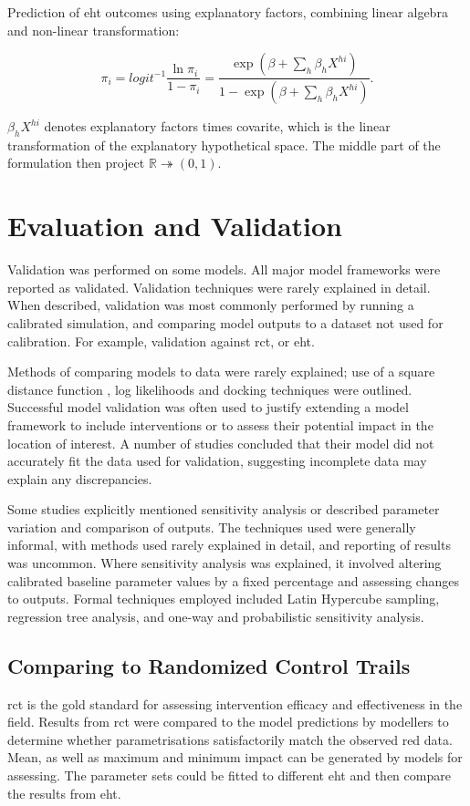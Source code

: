 \documentclass[a4paper, 12pt, twoside]{article}
\begin{document}
Prediction of \gls{eht} outcomes using explanatory factors, combining linear algebra and non-linear transformation\cite{Sherrard-Smith2018b}:

\[
	\pi_i = logit^{-1} \frac{\ln \pi_i}{1-\pi_i} = \frac{ \exp( \beta + \sum_h \beta_h X^{hi} ) }{ 1 - \exp( \beta + \sum_h \beta_h X^{hi} ) }
	.\]

$\beta_h X^{hi}$ denotes explanatory factors times covarite, which is the linear transformation of the explanatory hypothetical space. The middle part of the formulation then project $\mathbb{R} \twoheadrightarrow (0,1)$.

\section{Evaluation and Validation}
Validation was performed on some models.
All major model frameworks were reported as validated.
Validation techniques were rarely explained in detail.
When described, validation was most commonly performed by running a calibrated simulation, and comparing model outputs to a dataset not used for calibration.
For example, validation against \gls{rct}, or \gls{eht}.

Methods of comparing models to data were rarely explained; use of a square distance function , log likelihoods and docking techniques were outlined.
Successful model validation was often used to justify extending a model framework to include interventions or to assess their potential impact in the location of interest.
A number of studies concluded that their model did not accurately fit the data used for validation, suggesting incomplete data may explain any discrepancies.

Some studies explicitly mentioned sensitivity analysis or described parameter variation and comparison of outputs.
The techniques used were generally informal, with methods used rarely explained in detail, and reporting of results was uncommon.
Where sensitivity analysis was explained, it involved altering calibrated baseline parameter values by a fixed percentage and assessing changes to outputs.
Formal techniques employed included Latin Hypercube sampling, regression tree analysis, and one-way and probabilistic sensitivity analysis.

\subsection{Comparing to Randomized Control Trails}

\gls{rct} is the gold standard for assessing intervention efficacy and effectiveness in the field.
Results from \gls{rct} were compared to the model predictions by modellers to determine whether parametrisations satisfactorily match the observed red data\cite{Sherrard-Smith2018b}.
Mean, as well as maximum and minimum impact can be generated by models for assessing.
The parameter sets could be fitted to different \gls{eht} and then compare the results from \gls{eht}.
\end{document}
